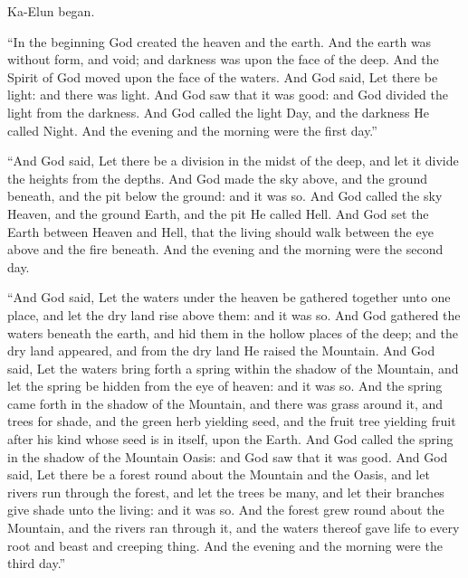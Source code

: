 Ka-Elun began.\par

\begin{scripture}
“In the beginning God created the heaven and the earth. And the earth was without form, and void; and darkness was upon the face of the deep. And the Spirit of God moved upon the face of the waters. And God said, Let there be light: and there was light. And God saw that it was good: and God divided the light from the darkness. And God called the light Day, and the darkness He called Night. And the evening and the morning were the first day.”
\end{scripture}

\begin{scripture}
“And God said, Let there be a division in the midst of the deep, and let it divide the heights from the depths. And God made the sky above, and the ground beneath, and the pit below the ground: and it was so. And God called the sky Heaven, and the ground Earth, and the pit He called Hell. And God set the Earth between Heaven and Hell, that the living should walk between the eye above and the fire beneath. And the evening and the morning were the second day.
\end{scripture}

\begin{scripture}
“And God said, Let the waters under the heaven be gathered together unto one place, and let the dry land rise above them: and it was so. And God gathered the waters beneath the earth, and hid them in the hollow places of the deep; and the dry land appeared, and from the dry land He raised the Mountain. And God said, Let the waters bring forth a spring within the shadow of the Mountain, and let the spring be hidden from the eye of heaven: and it was so. And the spring came forth in the shadow of the Mountain, and there was grass around it, and trees for shade, and the green herb yielding seed, and the fruit tree yielding fruit after his kind whose seed is in itself, upon the Earth. And God called the spring in the shadow of the Mountain Oasis: and God saw that it was good. And God said, Let there be a forest round about the Mountain and the Oasis, and let rivers run through the forest, and let the trees be many, and let their branches give shade unto the living: and it was so. And the forest grew round about the Mountain, and the rivers ran through it, and the waters thereof gave life to every root and beast and creeping thing. And the evening and the morning were the third day.”
\end{scripture}

